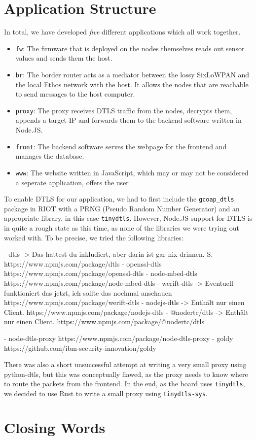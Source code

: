 \documentclass[10pt, a4paper]{article}
\begin{document}
    \section{Application Structure}

    In total, we have developed \emph{five} different applications which all work together.
    \begin{itemize}
        \item \texttt{fw}: The firmware that is deployed on the nodes themselves reads out sensor values and sends them the host.
        \item \texttt{br}: The border router acts as a mediator between the lossy SixLoWPAN and the local Ethos network with the host. It allows the nodes that are reachable to send messages to the host computer.
        \item \texttt{proxy}: The proxy receives DTLS traffic from the nodes, decrypts them, appends a target IP and forwards them to the backend software written in Node.JS.
        \item \texttt{front}: The backend software serves the webpage for the frontend and manages the database.
        \item \texttt{www}: The website written in JavaScript, which may or may not be considered a seperate application, offers the user
    \end{itemize}

    To enable DTLS for our application, we had to first include the \texttt{gcoap\_dtls} package in RIOT with a PRNG (Pseudo Random Number Generator) and an appropriate library, in this case \texttt{tinydtls}. However, Node.JS support for DTLS is in quite a rough state as this time, as none of the libraries we were trying out worked with. To be precise, we tried the following libraries:

    - dtls -> Das hattest du inkludiert, aber darin ist gar nix drinnen. S. https://www.npmjs.com/package/dtls
- openssl-dtls https://www.npmjs.com/package/openssl-dtls
- node-mbed-dtls https://www.npmjs.com/package/node-mbed-dtls
- werift-dtls -> Eventuell funktioniert das jetzt, ich sollte das nochmal anschauen https://www.npmjs.com/package/werift-dtls
- nodejs-dtls -> Enthält nur einen Client. https://www.npmjs.com/package/nodejs-dtls
- @nodertc/dtls -> Enthält nur einen Client. https://www.npmjs.com/package/@nodertc/dtls

    - node-dtls-proxy https://www.npmjs.com/package/node-dtls-proxy
- goldy https://github.com/ibm-security-innovation/goldy

    There was also a short unsuccessful attempt at writing a very small proxy using python-dtls, but this was conceptually flawed, as the proxy needs to know where to route the packets from the frontend. In the end, as the board uses \texttt{tinydtls}, we decided to use Rust to write a small proxy using \texttt{tinydtls-sys}.

    \section{Closing Words}

    \listoffigures
\end{document}

